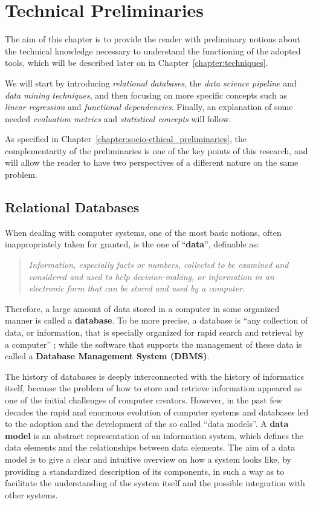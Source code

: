 \chapter{Technical Preliminaries}
\label{chapter:technical_preliminaries}
\thispagestyle{empty}

The aim of this chapter is to provide the reader with preliminary notions about the technical knowledge necessary to understand the functioning of the adopted tools, which will be described later on in Chapter~\ref{chapter:techniques}.

We will start by introducing \textit{relational databases}, the \textit{data science pipeline} and \textit{data mining techniques}, and then focusing on more specific concepts such as \textit{linear regression} and \textit{functional dependencies}. Finally, an explanation of some needed \textit{evaluation metrics} and \textit{statistical concepts} will follow.

As specified in Chapter~\ref{chapter:socio-ethical_preliminaries}, the complementarity of the preliminaries is one of the key points of this research, and will allow the reader to have two perspectives of a different nature on the same problem.


\section{Relational Databases}
\label{section:relational_databases}
When dealing with computer systems, one of the most basic notions, often inappropriately taken for granted, is the one of ``\textbf{data}'', definable as:
\begin{quote}\emph{Information, especially facts or numbers, collected to be examined and considered and used to help decision-making, or information in an electronic form that can be stored and used by a computer.} \cite{cambridge2013data}\end{quote}
Therefore, a large amount of data stored in a computer in some organized manner is called a \textbf{database}. To be more precise, a database is ``any collection of data, or information, that is specially organized for rapid search and retrieval by a computer'' \cite{britannica2020database}; while the software that supports the management of these data is called a \textbf{Database Management System (DBMS)}.

The history of databases is deeply interconnected with the history of informatics itself, because the problem of how to store and retrieve information appeared as one of the initial challenges of computer creators. However, in the past few decades the rapid and enormous evolution of computer systems and databases led to the adoption and the development of the so called ``data models''. A \textbf{data model} \cite{abiteboul1995foundations} is an abstract representation of an information system, which defines the data elements and the relationships between data elements. The aim of a data model is to give a clear and intuitive overview on how a system looks like, by providing a standardized description of its components, in such a way as to facilitate the understanding of the system itself and the possible integration with other systems.

